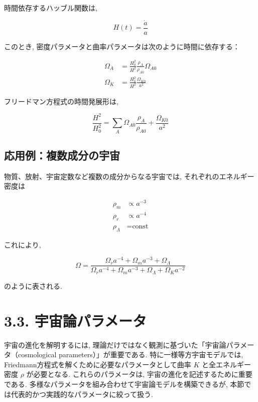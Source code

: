 \documentclass[a4paper,12pt]{article}
\begin{document}
  時間依存するハッブル関数は,
  
  \begin{equation*}
    H(t) = \frac{\dot{a}}{a}
  \end{equation*}
  
  このとき, 密度パラメータと曲率パラメータは次のように時間に依存する：
  
  \begin{align*}
    \Omega_A &= \frac{H_0^2}{H^2} \frac{\rho_A}{\rho_{A0}} \Omega_{A0} \\
    \Omega_K &= \frac{H_0^2}{H^2} \frac{\Omega_{K0}}{a^2}
  \end{align*}
  
  フリードマン方程式の時間発展形は,
  
  \begin{equation*}
    \frac{H^2}{H_0^2} = \sum_A \Omega_{A0} \frac{\rho_A}{\rho_{A0}} + \frac{\Omega_{K0}}{a^2}
  \end{equation*}
  
  \subsection*{応用例：複数成分の宇宙}
  
  物質、放射、宇宙定数など複数の成分からなる宇宙では, それぞれのエネルギー密度は
  
  \begin{align*}
    \rho_m &\propto a^{-3} \\
    \rho_r &\propto a^{-4} \\
    \rho_\Lambda &= \text{const}
  \end{align*}
  
  これにより,
  
  \begin{equation*}
    \Omega = \frac{\Omega_r a^{-4} + \Omega_m a^{-3} + \Omega_\Lambda}{\Omega_r a^{-4} + \Omega_m a^{-3} + \Omega_\Lambda + \Omega_K a^{-2}}
  \end{equation*}
  
  のように表される.
\color{black}

\section*{3.3. 宇宙論パラメータ}
宇宙の進化を解明するには, 理論だけではなく観測に基づいた「宇宙論パラメータ（cosmological parameters）」が重要である. 特に一様等方宇宙モデルでは, Friedmann方程式を解くために必要なパラメータとして曲率 $K$ と全エネルギー密度 $\rho$ が必要となる. これらのパラメータは, 宇宙の進化を記述するために重要である. 多様なパラメータを組み合わせて宇宙論モデルを構築できるが, 本節では代表的かつ実践的なパラメータに絞って扱う.
\end{document}
